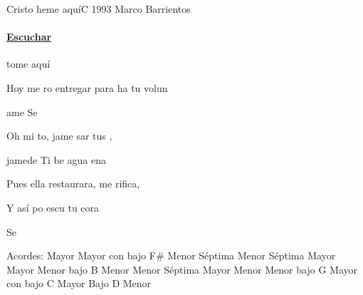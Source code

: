 \documentclass[12pt, spanish]{book}
\newcommand{\NotCCLIed}{\relax}
\begin{document}
    \begin{song}{Cristo heme aquí}{C}
        {1993} %
        {Marco Barrientos}
        {} %
        {} %
        \ifChordBk
        \paragraph{\mbox{}\hfill\protect\href{https://open.spotify.com/intl-es/track/6DiGXCeKFz3mjQS2vna7eV}{Escuchar}\mbox{}\hfill}
        \fi

        \begin{SBOpGroup}
            tome aquí

            Hoy me ro entregar para ha tu volun

            ame       Se
        \end{SBOpGroup}

        \begin{SBChorus}
            Oh mi to, jame  sar tus ,

            jamede Ti be  agua ena

            Pues ella  restaurara, me rifica,

            Y así po       escu tu cora

            Se
        \end{SBChorus}

        \ifChordBk
        \begin{SBOpGroup}
            Acordes:\break
             Mayor \hfill
             Mayor con bajo F\# \hfill\null\break
             Menor S\'eptima \hfill
             Menor S\'eptima \hfill\null\break
             Mayor \hfill
             Mayor \hfill\null\break
             Menor bajo B \hfill\null\break
             Menor \hfill
             Menor S\'eptima \hfill\null\break
             Mayor \hfill
             Menor \hfill\null\break
             Menor bajo G \hfill
             Mayor con bajo C \hfill\null\break
             Mayor Bajo D \hfill
             Menor \hfill\null\break
        \end{SBOpGroup}
        \fi
    \end{song}
\end{document}
